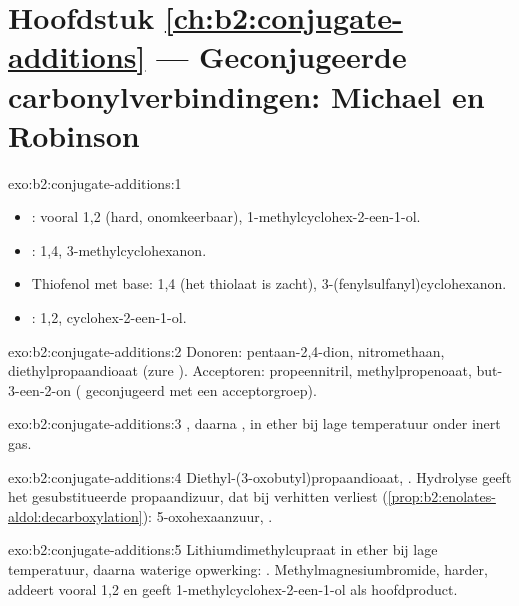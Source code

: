 \section*{Hoofdstuk \ref{ch:b2:conjugate-additions} --- Geconjugeerde carbonylverbindingen: Michael en Robinson}

\begin{solution}{exo:b2:conjugate-additions:1}
\begin{itemize}
  \item {}: vooral 1,2 (hard, onomkeerbaar), 1-methylcyclohex-2-een-1-ol.
  \item {}: 1,4, 3-methylcyclohexanon.
  \item Thiofenol met base: 1,4 (het thiolaat is zacht), 3-(fenylsulfanyl)cyclohexanon.
  \item {}: 1,2, cyclohex-2-een-1-ol.
\end{itemize}
\end{solution}

\begin{solution}{exo:b2:conjugate-additions:2}
Donoren: pentaan-2,4-dion, nitromethaan, diethylpropaandioaat (zure ). Acceptoren:
propeennitril, methylpropenoaat, but-3-een-2-on ( geconjugeerd met een acceptorgroep).
\end{solution}

\begin{solution}{exo:b2:conjugate-additions:3}
, daarna , in ether bij lage
temperatuur onder inert gas.
\end{solution}

\begin{solution}{exo:b2:conjugate-additions:4}
Diethyl-(3-oxobutyl)propaandioaat, . Hydrolyse geeft het gesubstitueerde
propaandizuur, dat bij verhitten  verliest (\cref{prop:b2:enolates-aldol:decarboxylation}):
5-oxohexaanzuur, .
\end{solution}

\begin{solution}{exo:b2:conjugate-additions:5}
Lithiumdimethylcupraat in ether bij lage temperatuur, daarna waterige opwerking: .
Methylmagnesiumbromide, harder, addeert vooral 1,2 en geeft 1-methylcyclohex-2-een-1-ol als
hoofdproduct.
\end{solution}


